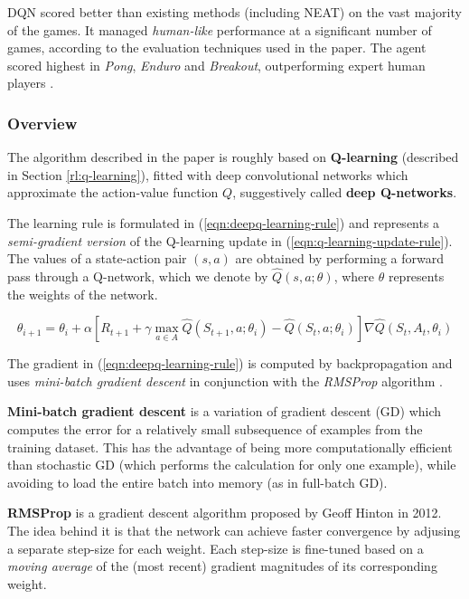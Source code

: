 DQN scored better than existing methods (including NEAT\footnotemark) on the vast majority of the games.
It managed \emph{human-like} performance at a significant number of games, according to the evaluation techniques used in the paper.
The agent scored highest in \emph{Pong}, \emph{Enduro} and \emph{Breakout}, outperforming expert human players \cite{atari-dqn}.

\subsubsection{Overview}
The algorithm described in the paper is roughly based on \textbf{Q-learning} (described in Section \ref{rl:q-learning}), fitted with deep convolutional networks which approximate the action-value function $Q$, suggestively called \textbf{deep Q-networks}.

The learning rule is formulated in (\ref{eqn:deepq-learning-rule}) and represents a \emph{semi-gradient version} of the Q-learning update in (\ref{eqn:q-learning-update-rule}).
The values of a state-action pair $(s, a)$ are obtained by performing a forward pass through a Q-network, which we denote by $\hat{Q}(s, a; \theta)$, where $\theta$ represents the weights of the network.

\begin{equation} \label{eqn:deepq-learning-rule}
    \theta_{i + 1} = \theta_{i} + \alpha [
        R_{t+1}
        + \gamma \max_{a \in A}{\hat{Q}(S_{t+1}, a; \theta_{i})}
        - \hat{Q}(S_{t}, a; \theta_{i})
    ]
    \nabla{\hat{Q}(S_t, A_t, \theta_{i})}
\end{equation}

The gradient in (\ref{eqn:deepq-learning-rule}) is computed by backpropagation and uses \emph{mini-batch gradient descent} in conjunction with the \emph{RMSProp} algorithm \cite{atari-dqn}.

\textbf{Mini-batch gradient descent} is a variation of gradient descent (GD) which computes the error for a relatively small subsequence of examples from the training dataset.
This has the advantage of being more computationally efficient than stochastic GD (which performs the calculation for only one example), while avoiding to load the entire batch into memory (as in full-batch GD).

\textbf{RMSProp} is a gradient descent algorithm proposed by Geoff Hinton in 2012.
The idea behind it is that the network can achieve faster convergence by adjusing a separate step-size for each weight.
Each step-size is fine-tuned based on a \emph{moving average} of the (most recent) gradient magnitudes of its corresponding weight.

